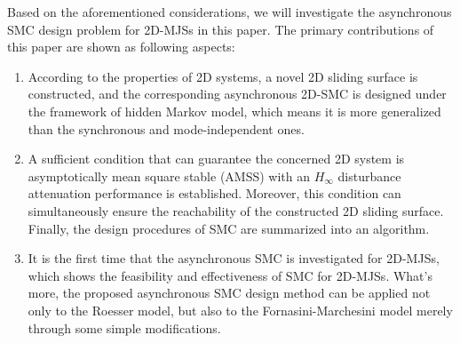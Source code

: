 \documentclass[conference]{IEEEtran}
\begin{document}
	Based on the aforementioned considerations, we will investigate the asynchronous SMC design problem for 2D-MJSs in this paper. 
	The primary contributions of this paper are shown as following aspects:
	\begin{enumerate}
		\item  According to the properties of 2D systems, a novel 2D sliding surface is constructed, and the corresponding asynchronous 2D-SMC  is designed under the framework of hidden Markov model, which means it is more generalized than the synchronous and mode-independent ones.
		\item  A sufficient condition that can guarantee the concerned 2D system is asymptotically mean square stable (AMSS) with an  $H_{\infty}$ disturbance attenuation performance is established. Moreover, this condition can simultaneously ensure the reachability of the constructed 2D sliding surface. Finally, the  design procedures of SMC are summarized into an algorithm.
		\item  It is the first time that the asynchronous SMC is investigated for 2D-MJSs, which shows the feasibility and effectiveness of SMC for 2D-MJSs. What's more, the proposed asynchronous SMC design method can be applied not only to the Roesser model, but also to the  Fornasini-Marchesini  model  merely through some simple modifications.
	\end{enumerate}
\end{document}
